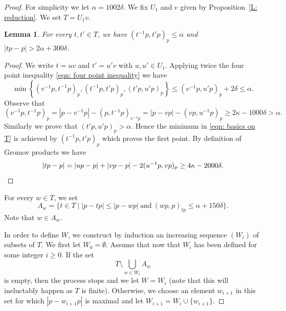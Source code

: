 \documentclass[11pt]{article}
\theoremstyle{plain}
\newtheorem{lem}[thm]{Lemma}
\theoremstyle{definition}
\begin{document}
\begin{proof}
For simplicity we let $\alpha = 1002\delta$.
We fix $U_1$ and $v$ given by Proposition~\ref{L: reduction}.
We set $T=U_1v$.

\begin{lem}
\label{res: basics on T}
For every $t, t' \in T$, we have $(t^{-1}p,t'p)_p\leq \alpha$ and $|tp - p| > 2\alpha + 300\delta$.
\end{lem}

\begin{proof}
We write $t = uv$ and $t' = u'v$ with $u,u' \in U_1$.
Applying twice the four point inequality \eqref{eqn: four point inequality} we have
\begin{equation}
\label{eqn: basics on T}
\min\left\{ (v^{-1}p, t^{-1}p)_p, (t^{-1}p, t'p)_p, (t'p, u'p)_p \right\} \leq (v^{-1}p, u'p)_p + 2\delta \leq \alpha.
\end{equation}
Observe that
\begin{equation*}
(v^{-1}p, t^{-1}p)_p
= |p - v^{-1}p| - (p, t^{-1}p)_{v^{-1}p}
= |p - vp| - (vp, u^{-1}p)_p
\geq 2\kappa - 1000\delta > \alpha.
\end{equation*}
Similarly we prove that $(t'p, u'p)_p > \alpha$.
Hence the minimum in \eqref{eqn: basics on T} is achieved by $(t^{-1}p, t'p)_p$ which proves the first point.
By definition of Gromov products we have
\begin{equation*}
|tp - p| = |up - p| + |vp - p| - 2 (u^{-1}p,vp)_p
\geq 4\kappa - 2000\delta. \qedhere
\end{equation*}
\end{proof}

For every $w \in T$, we set
\begin{equation*}
A_w =\{ t \in T \mid |p - tp| \leq |p -wp|\ \text{and}\ (wp,p)_{tp} \leq \alpha + 150\delta\}.
\end{equation*}
Note that $w \in A_w$.

In order to define $W$, we construct by induction an increasing sequence $(W_i)$ of subsets of $T$.
We first let $W_0 = \emptyset$.
Assume that now that $W_i$ has been defined for some integer $i \geq 0$.
If the set
\begin{equation*}
T \setminus \bigcup_{w \in W_i} A_w
\end{equation*}
is empty, then the process stops and we let $W = W_i$ (note that this will ineluctably happen as $T$ is finite).
Otherwise, we choose an element $w_{i+1}$ in this set for which $|p - w_{i+1}p|$ is maximal and let $W_{i+1} = W_i \cup \{w_{i+1}\}$.


\end{proof}
\end{document}
